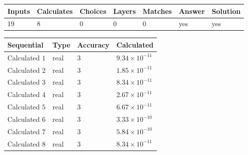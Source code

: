 \documentclass[12pt]{article}
\begin{document}
 

 
\vspace{0.3in}
   
   
   
   
\noindent\begin{tabular}{|l|l|l|l|l|l|l|}
 \hline
Inputs & Calculates & Choices & Layers & Matches & Answer & Solution \\ \hline
          19 & 
           8 & 
           0
  & 
           0 & 
           0 & 
  yes & 
  yes 
  \\ \hline
 \end{tabular}
   
   
   
   
\noindent{}
   
   
  
  
\noindent\begin{tabular}{|l|l|l|l|}
\hline
 Sequential & Type & Accuracy & Calculated \\ 
\hline
 
 
  Calculated $           1$ & real & $           3 $ & 
 $ 9.34 \times 10^{-11} $ 
 \\  \hline  
 
 
  Calculated $           2$ & real & $           3 $ & 
 $ 1.85 \times 10^{-11} $ 
 \\  \hline  
 
 
  Calculated $           3$ & real & $           3 $ & 
 $ 8.34 \times 10^{-11} $ 
 \\  \hline  
 
 
  Calculated $           4$ & real & $           3 $ & 
 $ 2.67 \times 10^{-11} $ 
 \\  \hline  
 
 
  Calculated $           5$ & real & $           3 $ & 
 $ 6.67 \times 10^{-11} $ 
 \\  \hline  
 
 
  Calculated $           6$ & real & $           3 $ & 
 $ 3.33 \times 10^{-10} $ 
 \\  \hline  
 
 
  Calculated $           7$ & real & $           3 $ & 
 $ 5.84 \times 10^{-10} $ 
 \\  \hline  
 
 
  Calculated $           8$ & real & $           3 $ & 
 $ 8.34 \times 10^{-11} $ 
 \\  \hline  
 \end{tabular}
   
\end{document}
